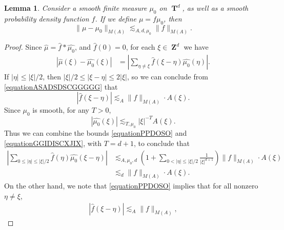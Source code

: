 \documentclass[12pt,reqno]{article}
\numberwithin{equation}{section}
\DeclareMathOperator{\ZZ}{\mathbf{Z}}
\DeclareMathOperator{\TT}{\mathbf{T}}
\newtheorem{lemma}[theorem]{Lemma}
\begin{document}
\begin{lemma} \label{LemmaTTSICICS}
    Consider a smooth finite measure $\mu_0$ on $\TT^d$, as well as a smooth probability density function $f$. If we define $\mu = f \mu_0$, then
    \[ \| \mu - \mu_0 \|_{M(A)} \lesssim_{A,d,\mu_0} \| f \|_{M(A)}. \]
\end{lemma}
\begin{proof}
    Since $\widehat{\mu} = \widehat{f} * \widehat{\mu_0}$, and $\widehat{f}(0) = 0$, for each $\xi \in \ZZ^d$ we have
    \begin{equation} \label{equationPPYTUECUUCS}
    \begin{split}
        |\widehat{\mu}(\xi) - \widehat{\mu_0}(\xi)| &= \left| \sum_{\eta \neq \xi} \widehat{f}(\xi - \eta) \widehat{\mu_0}(\eta) \right|.
    \end{split}
    \end{equation}
    If $|\eta| \leq |\xi|/2$, then $|\xi|/2 \leq |\xi - \eta| \leq 2 |\xi|$, so we can conclude from \eqref{equationASADSDSCGGGGG} that
    \begin{equation} \label{equationPPDOSO}
        |\widehat{f}(\xi - \eta)| \lesssim_A \| f \|_{M(A)} \cdot A(\xi).
    \end{equation}
    Since $\mu_0$ is smooth, for any $T > 0$,
    \begin{equation} \label{equationGGIDISCXJIX}
        |\widehat{\mu_0}(\xi)| \lesssim_{T,\mu_0} |\xi|^{-T} A(\xi).
    \end{equation}
    Thus we can combine the bounds \eqref{equationPPDOSO} and \eqref{equationGGIDISCXJIX}, with $T = d+1$, to conclude that
    \begin{equation} \label{equationGGPSOVVCSI}
    \begin{split}
        \left| \sum_{0 \leq |\eta| \leq |\xi|/2} \widehat{f}(\eta) \widehat{\mu_0}(\xi - \eta) \right| &\lesssim_{A,\mu_0,d} \left( 1 + \sum_{0 < |\eta| \leq |\xi|/2} \frac{1}{|\xi|^{d+1}} \right) \| f \|_{M(A)} \cdot A(\xi)\\
        &\lesssim_d \| f \|_{M(A)} \cdot A(\xi).
    \end{split}
    \end{equation}
    On the other hand, we note that \eqref{equationPPDOSO} implies that for all nonzero $\eta \neq \xi$,
    \begin{equation} \label{equationGGDPSOX}
    \begin{split}
        |\widehat{f}(\xi - \eta)| \lesssim_A \| f \|_{M(A)},

\end{split}
\end{equation}
\end{proof}
\end{document}
